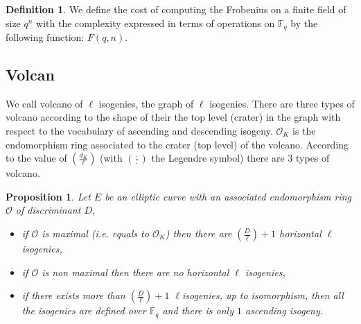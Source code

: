 \documentclass{article}
\theoremstyle{plain}
\newtheorem{prop}[thm]{Proposition}
\theoremstyle{definition}
\newtheorem{defi}[thm]{Definition}
\theoremstyle{remark}
\begin{document}
\begin{defi}
We define the cost of computing the Frobenius on a finite field of size $q^n$ with the complexity expressed in terms of operations on $\mathbb{F}_q$ by the following function: $F(q,n)$.
\end{defi}

\subsection{Volcan}
We call volcano of $\ell$ isogenies, the graph of $\ell$ isogenies. There are three types of volcano according to the shape of their the top level (crater) in the graph with respect to the vocabulary of ascending and descending isogeny. $\mathcal{O}_K$ is the endomorphism ring associated to the crater (top level) of the volcano. According to the value of $\left( \frac{d_{K}}{\ell} \right)$ (with $\left( \frac{\cdot}{\cdot} \right)$ the Legendre symbol) there are $3$ types of volcano.
\begin{prop} %
Let $E$ be an elliptic curve with an associated endomorphism ring $\mathcal{O}$ of discriminant $D$, %
\begin{itemize}
\item if $\mathcal{O}$ is maximal (i.e. equals to $\mathcal{O}_K$) then there are $\left( \frac{D}{\ell} \right) +1 $ horizontal $\ell$ isogenies,
\item if $\mathcal{O}$ is non maximal then there are no horizontal $\ell$ isogenies,
\item if there exists more than $\left( \frac{D}{\ell} \right) +1 $  $\ell$isogenies, up to isomorphism, then all the isogenies are defined over $\mathbb{F}_q$ and there is only $1$ ascending isogeny. 
\end{itemize}
\end{prop} 
\end{document}
